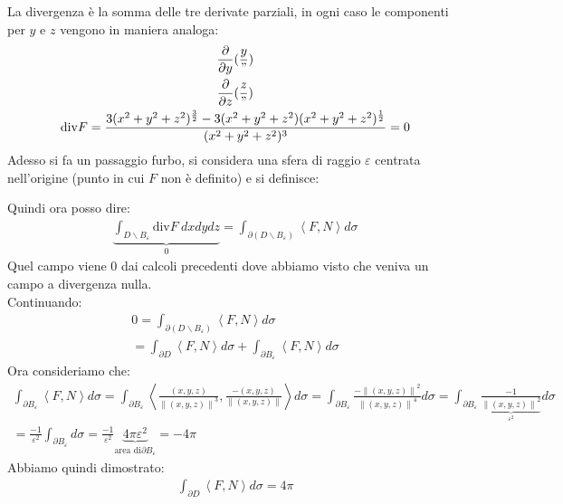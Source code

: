 \documentclass[a4paper, oneside]{article}
\begin{document}
La divergenza è la somma delle tre derivate parziali, in ogni caso le componenti per $y$ e $z$ vengono in maniera analoga:
\begin{gather*}
  \frac{\partial}{\partial y} (\frac{y}{"})\\
  \frac{\partial}{\partial z} (\frac{z}{"})\\
  \text{div}F = \frac{3(x^2+y^2+z^2)^{\frac{3}{2}} - 3(x^2+y^2+z^2)(x^2+y^2+z^2)^{\frac{1}{2}}}{(x^2+y^2+z^2)^3} = 0
\end{gather*}
Adesso si fa un passaggio furbo, si considera una sfera di raggio $\varepsilon$ centrata nell'origine (punto in cui $F$ non è definito) e si definisce:
\begin{center}
\end{center}
Quindi ora posso dire:
\begin{gather*}
  \underbrace{\int_{D \backslash B_\varepsilon} \text{div}F \ dxdydz}_{0} = \int_{\partial (D \backslash B_\varepsilon)} \left\langle F , N \right\rangle d\sigma
\end{gather*}
Quel campo viene $0$ dai calcoli precedenti dove abbiamo visto che veniva un campo a divergenza nulla.\\
Continuando:
\begin{gather*}
  0 = \int_{\partial (D \backslash B_\varepsilon)} \left\langle F , N \right\rangle d\sigma\\
  = \int_{\partial D} \left\langle F , N \right\rangle d\sigma + \int_{\partial B_\varepsilon} \left\langle F , N \right\rangle d\sigma
\end{gather*}
Ora consideriamo che:
\begin{gather*}
  \int_{\partial B_\varepsilon} \left\langle F , N \right\rangle d\sigma = \int_{\partial B_\varepsilon} \left\langle \frac{(x,y,z)}{\left\lVert (x,y,z) \right\rVert^3} , \frac{-(x,y,z)}{\left\lVert (x,y,z) \right\rVert } \right\rangle d\sigma = \int_{\partial B_\varepsilon} \frac{-\left\lVert (x,y,z) \right\rVert^2}{\left\lVert (x,y,z) \right\rVert^4} d\sigma = \int_{\partial B_\varepsilon} \frac{-1}{\underbrace{\left\lVert (x,y,z) \right\rVert^2}_{\varepsilon^2}} d\sigma\\
  = \frac{-1}{\varepsilon^2} \int_{\partial B_\varepsilon} d\sigma = \frac{-1}{\varepsilon^2} \underbrace{4 \pi \varepsilon^2}_{\text{area di} \partial B_\varepsilon} = -4\pi
\end{gather*}
Abbiamo quindi dimostrato:
\begin{gather*}
  \int_{\partial D} \left\langle F , N \right\rangle d\sigma = 4\pi
\end{gather*}
\end{document}

